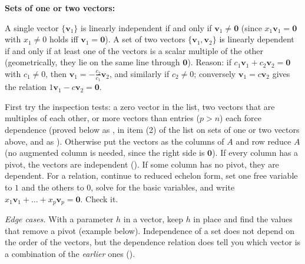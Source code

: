 \documentclass[10pt]{scrartcl}
\newcommand{\vv}[1]{\mathbf{#1}}
\begin{document}
\begin{itemize}
  \ii \textbf{Sets of one or two vectors:}
  \begin{enumerate}[(1)]
    \ii A single vector $\{\vv v_1\}$ is linearly independent if and only if $\vv v_1\ne\vv 0$ (since $x_1\vv v_1=\vv 0$ with $x_1\ne 0$ holds iff $\vv v_1=\vv 0$).
    \ii A set of two vectors $\{\vv v_1,\vv v_2\}$ is linearly dependent if and only if at least one of the vectors is a scalar multiple of the other (geometrically, they lie on the same line through $\vv 0$). Reason: if $c_1\vv v_1+c_2\vv v_2=\vv 0$ with $c_1\ne0$, then $\vv v_1=-\tfrac{c_2}{c_1}\vv v_2$, and similarly if $c_2\ne0$; conversely $\vv v_1=c\vv v_2$ gives the relation $1\vv v_1-c\vv v_2=\vv 0$.
  \end{enumerate}
\end{itemize}

\begin{steps}
  \ii First try the inspection tests: a zero vector in the list, two vectors that are multiples of each other, or more vectors than entries ($p>n$) each force dependence (proved below as , in item (2) of the list on sets of one or two vectors above, and as ).
  \ii Otherwise put the vectors as the columns of $A$ and row reduce $A$ (no augmented column is needed, since the right side is $\vv 0$).
  \ii If every column has a pivot, the vectors are independent ().
  \ii If some column has no pivot, they are dependent. For a relation, continue to reduced echelon form, set one free variable to $1$ and the others to $0$, solve for the basic variables, and write $x_1\vv v_1+\dots+x_p\vv v_p=\vv 0$. Check it.
\end{steps}
\emph{Edge cases.} With a parameter $h$ in a vector, keep $h$ in place and find the values that remove a pivot (example below). Independence of a set does not depend on the order of the vectors, but the dependence relation does tell you which vector is a combination of the \emph{earlier} ones ().
\end{document}
